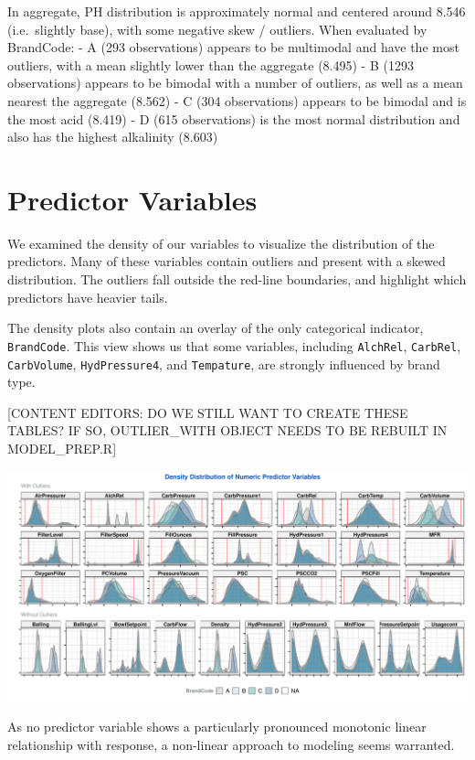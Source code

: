 \documentclass[]{report}
\begin{document}
In aggregate, PH distribution is approximately normal and centered
around 8.546 (i.e.~slightly base), with some negative skew / outliers.
When evaluated by BrandCode: - A (293 observations) appears to be
multimodal and have the most outliers, with a mean slightly lower than
the aggregate (8.495) - B (1293 observations) appears to be bimodal with
a number of outliers, as well as a mean nearest the aggregate (8.562) -
C (304 observations) appears to be bimodal and is the most acid (8.419)
- D (615 observations) is the most normal distribution and also has the
highest alkalinity (8.603)

\hypertarget{predictor-variables}{%
\section{Predictor Variables}\label{predictor-variables}}

We examined the density of our variables to visualize the distribution
of the predictors. Many of these variables contain outliers and present
with a skewed distribution. The outliers fall outside the red-line
boundaries, and highlight which predictors have heavier tails.

The density plots also contain an overlay of the only categorical
indicator, \texttt{BrandCode}. This view shows us that some variables,
including \texttt{AlchRel}, \texttt{CarbRel}, \texttt{CarbVolume},
\texttt{HydPressure4}, and \texttt{Tempature}, are strongly influenced
by brand type.

{[}CONTENT EDITORS: DO WE STILL WANT TO CREATE THESE TABLES? IF SO,
OUTLIER\_WITH OBJECT NEEDS TO BE REBUILT IN MODEL\_PREP.R{]}

\includegraphics{Group2_Project2_Fall2019_files/figure-latex/unnamed-chunk-4-1.pdf}

As no predictor variable shows a particularly pronounced monotonic
linear relationship with response, a non-linear approach to modeling
seems warranted.
\end{document}
